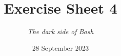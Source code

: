 




\title{{\vspace{-12mm}\huge\textbf{Exercise Sheet 4}}}
\author{\textit{The dark side of Bash}}
\date{{\small 28 September 2023}}


    \maketitle
    \bigskip
    
    \bigskip
    
    \bigskip
    
    \bigskip
    
